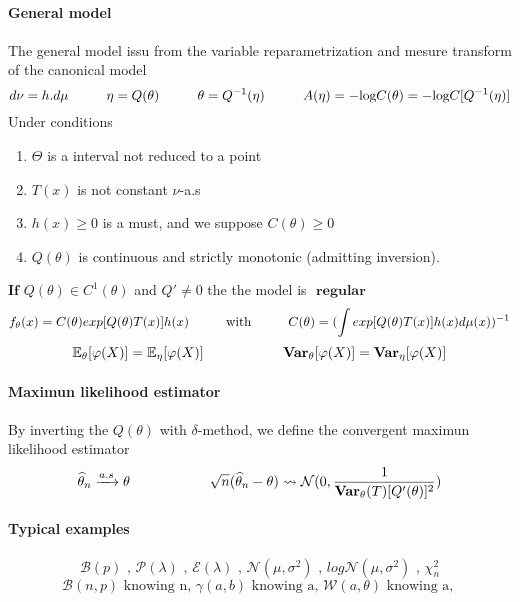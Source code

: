 \documentclass[a4paper,10pt]{article}
\begin{document}
\paragraph{General model}
The general model issu from the variable reparametrization and mesure transform of the canonical model
\[
d\nu = h.d\mu  \hspace{10mm} \eta = Q(\theta) \hspace{10mm}  \theta = Q^{-1}(\eta) \hspace{10mm} 
A(\eta) = -\text{log}C(\theta) =  -\text{log}C[Q^{-1}(\eta)] 
\]
Under conditions 
\begin{enumerate}
 \item $\Theta$ is a interval not reduced to a point
 \item $T(x)$ is not constant $\nu$-a.s
 \item $h(x) \geq 0$ is a must, and we suppose $C(\theta) \geq 0$
 \item $Q(\theta)$ is continuous and strictly monotonic (admitting inversion). 
\end{enumerate}
$\textbf{If } Q(\theta) \in C^{1}(\theta)$ and $Q'\neq 0$ the the model is $\textbf{ regular}$
\[
f_{\theta}(x) = C(\theta) exp[Q(\theta) T(x)] h(x)
\hspace{10mm} \text{with} \hspace{10mm}
C(\theta) = (\int exp[Q(\theta) T(x)] h(x) d\mu(x) ) ^{-1}
\]
\[
\mathbb{E}_{\theta}[\varphi(X)]  = \mathbb{E}_{\eta}[\varphi(X)]
 \hspace{20mm}
\textbf{Var}_{\theta}[\varphi(X)]  = \textbf{Var}_{\eta}[\varphi(X)]
\]
\paragraph{Maximun likelihood estimator}
By inverting the $Q(\theta)$ with $\delta$-method, we define the convergent maximun likelihood estimator 
\[
\widehat{\theta}_n \xrightarrow{a.s} \theta 
\hspace{20mm}
\sqrt{n}(\widehat{\theta}_n - \theta ) \rightsquigarrow   \mathcal{N}(0,\frac{1}{\textbf{Var}_{\theta}(T)[Q'(\theta)]^2  } )
\]
\paragraph{Typical examples}
\[
\mathcal{B}(p)
\text{ , }
\mathcal{P}(\lambda)
\text{ , }
\mathcal{E}(\lambda)
\text{ , }
\mathcal{N}(\mu,\sigma^2)
\text{ , }
log\mathcal{N}(\mu,\sigma^2)
\text{ , }
\chi^2_n
\]
\[
\mathcal{B}(n,p) \text{ knowing n, }
\gamma(a,b) \text{ knowing a,  }
\mathcal{W}(a,\theta) \text{ knowing a, }
\]
\end{document}
